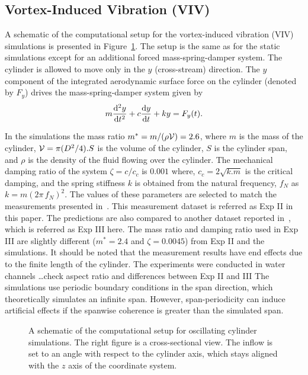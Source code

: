 \subsection{Vortex-Induced Vibration (VIV)}
\label{sec:VIV}
%
A schematic of the computational setup for the vortex-induced vibration (VIV)
simulations is presented in Figure~\ref{fig:VIVmodel}. The setup is the same as
for the static simulations except for an additional forced mass-spring-damper
system. The cylinder is allowed to move only in the $y$ (cross-stream)
direction. The $y$ component of the integrated aerodynamic surface force on the
cylinder (denoted by $F_y$) drives the mass-spring-damper system given by
%
\begin{equation}
  m \frac{{\rm d}^2 y}{{\rm d}t^2} + c \frac{{\rm d} y}{{\rm d}t} + k y = F_y(t).
  \label{eq:mass-spring-damper}
\end{equation}
 
In the simulations the mass ratio $m^*=m/(\rho {\cal V})=2.6$, where $m$ is the
mass of the cylinder, ${\cal V}=\pi (D^2/4) . S$ is the volume of the cylinder,
$S$ is the cylinder span, and $\rho$ is the density of the fluid flowing over
the cylinder. The mechanical damping ratio of the system $\zeta = c/c_c$ is
$0.001$ where, $c_c=2\sqrt{k.m}$ is the critical damping, and the spring
stiffness $k$ is obtained from the natural frequency, $f_N$ as
$k=m(2\pi\,f_N)^2$. The values of these parameters are selected to match the
measurements presented in~\cite{franzini2013one}. This measurement dataset is
referred as Exp II in this paper. The predictions are also compared to another
dataset reported in~\cite{khalak1997fluid}, which is referred as Exp III here.
The mass ratio and damping ratio used in Exp III are slightly different
($m^*=2.4$ and $\zeta=0.0045$) from Exp II and the simulations. It should be
noted that the measurement results have end effects due to the finite length of
the cylinder. {\color{red} The experiments were conducted in water channels
\ldots check aspect ratio and differences between Exp II and III} The
simulations use periodic boundary conditions in the span direction, which
theoretically simulates an infinite span. However, span-periodicity can induce
artificial effects if the spanwise coherence is greater than the simulated
span.
%
\begin{figure}[htb!]
  \caption{A schematic of the computational setup for oscillating cylinder
    simulations. The right figure is a cross-sectional view.  The inflow is set
    to an angle with respect to the cylinder axis, which stays aligned with the $z$
    axis of the coordinate system.}
  \label{fig:VIVmodel}
\end{figure}

